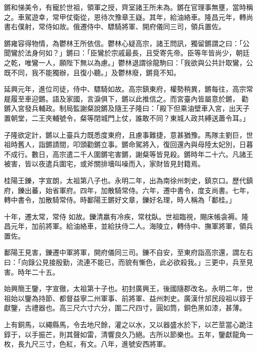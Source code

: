 \begin{pinyinscope}
 鏘和悌美令，有寵於世祖，領軍之授，齊室諸王所未為。鏘在官理事無壅，當時稱之。車駕遊幸，常甲仗衛從，恩待次豫章王嶷。其年，給油絡車。隆昌元年，轉尚書右僕射，常侍如故。俄遷侍中、驃騎將軍、開府儀同三司，領兵置佐。



 鏘雍容得物情，為鬱林王所依信。鬱林心疑高宗，諸王問訊，獨留鏘謂之曰：「公聞鸞於法身何如？」鏘曰：「臣鸞於宗戚最長，且受寄先帝。臣等年皆尚少，朝廷之乾，唯鸞一人，願陛下無以為慮。」鬱林退謂徐龍駒曰：「我欲與公共計取鸞，公既不同，我不能獨辦，且復小聽。」及鬱林廢，鏘竟不知。



 延興元年，進位司徒，侍中、驃騎如故。高宗鎮東府，權勢稍異，鏘每往，高宗常屣履至車迎鏘。語及家國，言淚俱下，鏘以此推信之。而宮臺內皆屬意於鏘，
 勸鏘入宮發兵輔政。制局監謝粲說鏘及隨王子隆曰：「殿下但乘油壁車入宮，出天子置朝堂，二王夾輔號令，粲等閉城門上仗，誰敢不同？東城人政共縛送蕭令耳。」



 子隆欲定計，鏘以上臺兵力既悉度東府，且慮事難捷，意甚猶豫。馬隊主劉巨，世祖時舊人，詣鏘請間，叩頭勸鏘立事。鏘命駕將入，復回還內與母陸太妃別，日暮不成行。數日，高宗遣二千人圍鏘宅害鏘，謝粲等皆見殺。鏘時年二十六。凡諸王被害，皆以夜遣兵圍宅，或斧關排墻叫噪而入，家財皆見封籍焉。



 桂陽王鑠，字宣朗，太祖第八子也。永明二年，出為南徐州刺史，鎮京口。歷代鎮府，鑠出蕃，始省軍府。四年，加散騎常侍。六年，遷中書令，度支尚書。七年，轉中書令，加散騎常侍。時鄱陽王鏘好文章，鑠好名理，時人稱為「鄱桂。」



 十年，遷太常，常侍
 如故。鑠清羸有冷疾，常枕臥。世祖臨視，賜床帳衾褥。隆昌元年，加前將軍。給油絡車，並給扶侍二人。海陵立，轉侍中、撫軍將軍，領兵置佐。



 鄱陽王見害，鑠遷中軍將軍，開府儀同三司。鑠不自安，至東府詣高宗還，謂左右曰：「向錄公見接殷勤，流連不能已，而貌有慚色，此必欲殺我。」三更中，兵至見害。時年二十五。



 始興簡王鑒，字宣徹，太祖第十子也。初封廣興王，後國隨郡改名。永明二年，世祖始以鑒為持節、都督益寧二州軍事、前將軍、益州刺史。廣漢什邡民段祖以錞于獻鑒，古禮器也。高三尺六寸六分，圍二尺四寸，圓如筒，銅色黑如漆，甚薄。



 上有銅馬，以繩縣馬，令去地尺餘，灌之以水，又以器盛水於下，以芒莖當心跪注錞于，以手振芒，則其聲如雷，清響良久乃絕。古所以節樂也。五年，鑒獻龍角一枚，長九尺三寸，色紅，有文。八年，進號安西將軍。




\end{pinyinscope}
